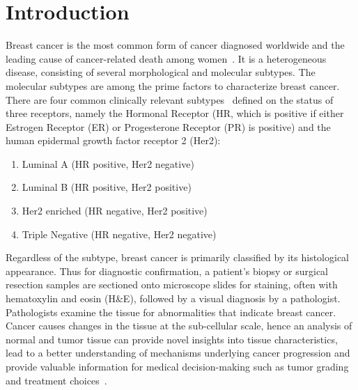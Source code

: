 
\chapter{Introduction}\label{chapter:introduction}
Breast cancer is the most common form of cancer diagnosed worldwide
and the leading cause of cancer-related death among women~\cite{chhikara2022global}.
It is a heterogeneous disease, consisting of several morphological and molecular subtypes.
The molecular subtypes are among the prime factors to characterize breast cancer.
There are four common clinically relevant subtypes~\cite{home} defined on the status of three receptors,
namely the Hormonal Receptor (HR, which is positive if either Estrogen Receptor (ER)
or Progesterone Receptor (PR) is positive) and the human epidermal
growth factor receptor 2 (Her2):
\begin{enumerate}
    \itemsep0em 
    \item Luminal A (HR positive, Her2 negative)
    \item Luminal B (HR positive, Her2 positive)
    \item Her2 enriched (HR negative, Her2 positive) 
    \item Triple Negative (HR negative, Her2 negative)
\end{enumerate}
Regardless of the subtype, breast cancer is primarily classified by its histological appearance. 
Thus for diagnostic confirmation, a patient’s biopsy or surgical resection samples
are sectioned onto microscope slides for staining, often with hematoxylin and eosin
(H\&E), followed by a visual diagnosis by a pathologist. Pathologists examine the
tissue for abnormalities that indicate breast cancer. 
Cancer causes changes in the tissue at the sub-cellular scale, hence an analysis of normal
and tumor tissue can provide novel insights into
tissue characteristics, lead to a better understanding of mechanisms
underlying cancer progression and provide valuable information for medical
decision-making such as tumor grading and treatment choices~\cite{vu2019methods}.

